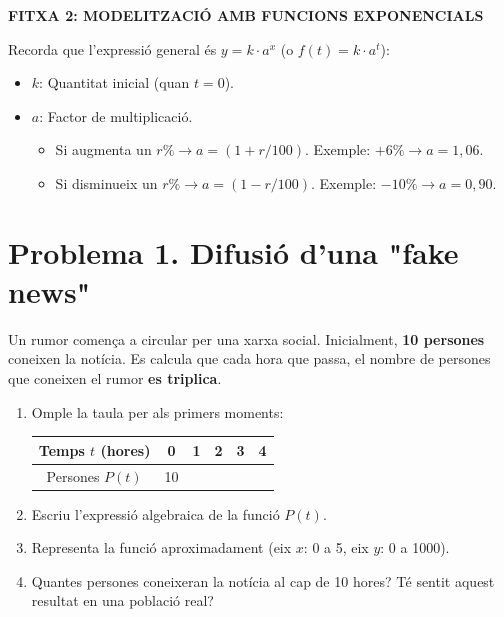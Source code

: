 \documentclass[12pt,a4paper]{article}
\begin{document}
\begin{center}
    \textbf{\Large FITXA 2: MODELITZACIÓ AMB FUNCIONS EXPONENCIALS}
\end{center}

\vspace{0.3cm}

\begin{tcolorbox}[colback=blaufosc!5, colframe=blaufosc, title=\textbf{Guia de treball: Creixement i Decreixement}]
    Recorda que l'expressió general és $y = k \cdot a^x$ (o $f(t) = k \cdot a^t$):
    \begin{itemize}
        \item \textbf{$k$}: Quantitat inicial (quan $t=0$).
        \item \textbf{$a$}: Factor de multiplicació.
        \begin{itemize}
            \item Si augmenta un $r\% \to a = (1 + r/100)$. Exemple: $+6\% \to a=1,06$.
            \item Si disminueix un $r\% \to a = (1 - r/100)$. Exemple: $-10\% \to a=0,90$.
        \end{itemize}
    \end{itemize}
\end{tcolorbox}

\vspace{0.4cm}

\section*{Problema 1. Difusió d'una "fake news"}
Un rumor comença a circular per una xarxa social. Inicialment, \textbf{10 persones} coneixen la notícia. Es calcula que cada hora que passa, el nombre de persones que coneixen el rumor \textbf{es triplica}.

\begin{enumerate}[label=\alph*)]
    \item Omple la taula per als primers moments:
    \begin{center}
        \begin{tabular}{|c|c|c|c|c|c|}
        \hline
        Temps $t$ (hores) & 0 & 1 & 2 & 3 & 4 \\ \hline
        Persones $P(t)$ & 10 & & & & \\ \hline
        \end{tabular}
    \end{center}
    \item Escriu l'expressió algebraica de la funció $P(t)$.
    \item Representa la funció aproximadament (eix $x$: 0 a 5, eix $y$: 0 a 1000).
    \item Quantes persones coneixeran la notícia al cap de 10 hores? Té sentit aquest resultat en una població real?
\end{enumerate}
\end{document}
